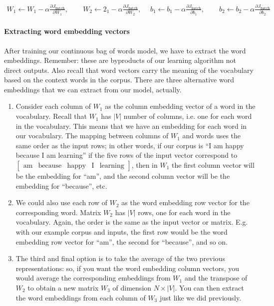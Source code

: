 \documentclass[12pt]{article}
\begin{document}
\begin{align*}
  W_1 \gets W_1 - \alpha \frac{\partial J_{\texttt{batch}}}{\partial W_1}  ,\hspace{25pt}
  W_2 \gets 2_1 - \alpha \frac{\partial J_{\texttt{batch}}}{\partial W_2} ,\hspace{15pt}
  b_1 \gets b_1 - \alpha \frac{\partial J_{\texttt{batch}}}{\partial b_1} ,\hspace{25pt}
  b_2 \gets b_2 - \alpha \frac{\partial J_{\texttt{batch}}}{\partial b_2}
\end{align*}

\paragraph{Extracting word embedding vectors} After training our continuous bag of words model, we have to extract the word embeddings. Remember: these are byproducts of our learning algorithm not direct outputs. Also recall that word vectors carry the meaning of the vocabulary based on the context words in the corpus. There are three alternative word embeddings that we can extract from our model, actually.
\begin{enumerate}
\item Consider each column of $W_1$ as the column embedding vector of a word in the vocabulary. Recall that $W_1$ has $|V|$ number of columns, i.e. one for each word in the vocabulary. This means that we have an embedding for each word in our vocabulary. The mapping between columns of $W_1$ and words uses the same order as the input rows; in other words, if our corpus is ``I am happy because I am learning'' if the five rows of the input vector correspond to
$\begin{bmatrix}\textrm{am} & \textrm{because} & \textrm{happy} & \textrm{I} & \textrm{learning} \end{bmatrix}$, then in $W_1$ the first column vector will be the embedding for ``am'', and the second column vector will be the embedding for ``because'', etc.
\item We could also use each row of $W_2$ as the word embedding row vector for the corresponding word. Matrix $W_2$ has $|V|$ rows, one for each word in the vocabulary. Again, the order is the same as the input vector or matrix. E.g. with our example corpus and inputs, the first row would be the word embedding row vector for ``am'', the second for ``because'', and so on.
\item The third and final option is to take the average of the two previous representations: so, if you want the word embedding column vectors, you would average the corresponding embeddings from $W_1$ and the transpose of $W_2$ to obtain a new matrix $W_3$ of dimension $N \times |V|$. You can then extract the word embeddings from each column of $W_3$ just like we did previously.
\end{enumerate}
\end{document}
